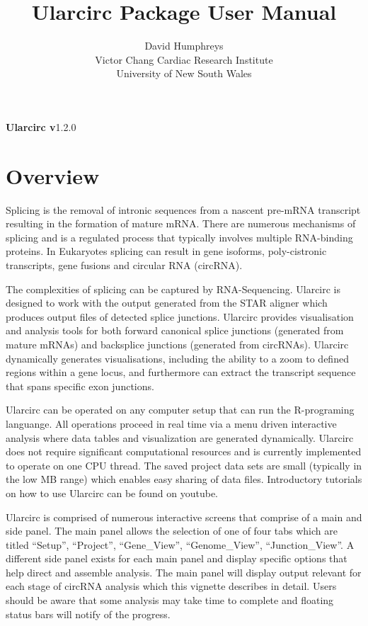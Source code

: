 \documentclass[12pt]{article}\usepackage[]{graphicx}\usepackage[]{color}
\title{Ularcirc Package User Manual}
\author{David Humphreys\\
Victor Chang Cardiac Research Institute\\
University of New South Wales
}
\begin{document}
\maketitle

\begin{center}
\textbf{Ularcirc v}1.2.0
\end{center}

\tableofcontents



\section{Overview} \label{sec:praeludium}

\indent Splicing is the removal of intronic sequences from a nascent pre-mRNA transcript resulting in the formation of mature mRNA. There are numerous mechanisms of splicing and is a regulated process that typically involves multiple RNA-binding proteins. In Eukaryotes splicing can result in gene isoforms, poly-cistronic transcripts, gene fusions and circular RNA (circRNA). \par
 The complexities of splicing  can be captured by RNA-Sequencing. Ularcirc is designed to work with the output generated from the STAR aligner which produces output files of detected splice junctions. Ularcirc provides visualisation and analysis tools for both forward canonical splice junctions (generated from mature mRNAs) and backsplice junctions (generated from circRNAs). Ularcirc dynamically generates visualisations, including the ability to a zoom to defined regions within a gene locus, and furthermore can extract the transcript sequence that spans specific exon junctions. \par
 Ularcirc can be operated on any computer setup that can run the R-programing languange. All operations proceed in real time via a menu driven interactive analysis where data tables and visualization are generated dynamically. Ularcirc does not require significant computational resources and is currently implemented to operate on one CPU thread. The saved project data sets are small (typically in the low MB range) which enables easy sharing of data files. Introductory tutorials on how to use Ularcirc can be found on youtube. \par
Ularcirc is comprised of numerous interactive screens that comprise of a main and side panel. The main panel allows the selection of one of four tabs which are titled ``Setup'', ``Project'', ``Gene\_View'', ``Genome\_View'', ``Junction\_View''. A different side panel exists for each main panel and display  specific options that help direct and assemble analysis. The main panel will display output relevant for each stage of circRNA analysis which this vignette describes in detail. Users should be aware that some analysis may take time to complete and floating status bars will notify of the progress.
\end{document}
